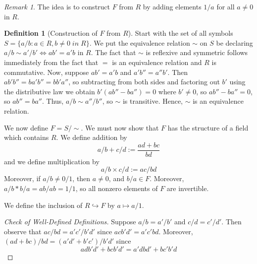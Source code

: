 \documentclass[12pt]{article}
\theoremstyle{definition}
\newtheorem{defn}[thm]{Definition}
\theoremstyle{remark}
\newtheorem{rmk}[thm]{Remark}
\numberwithin{equation}{section}
\begin{document}
\vspace{15pt}

\begin{rmk}
        The idea is to construct $F$ from $R$ by adding elements $1/a$ for all $a \neq 0$ in $R$.
\end{rmk}


\vspace{15pt}

\begin{defn}[Construction of $F$ from $R$]
        Start with the set of all symbols $S = \{a/b:a \in R, b \neq 0 \;in\;R\}$. We put the equivalence relation $\sim$ on $S$ be declaring $a/b\sim a'/b' \iff ab' = a'b$ in $R$. The fact that $\sim$ is reflexive and symmetric follows immediately from the fact that $=$ is an equivalence relation and $R$ is commutative. Now, suppose $ab' = a'b$ and $a'b'' = a''b'$. Then $ab'b'' =ba'b'' = bb'a''$, so subtracting from both sides and factoring out $b'$ using the distributive law we obtain $b'(ab''-ba'') = 0$ where $b' \neq 0$, so $ab'' - ba'' = 0$, so $ab'' = ba''$. Thus, $a/b \sim a''/b''$, so $\sim$ is transitive. Hence, $\sim$ is an equivalence relation. 


        We now define $F = S/\sim$. We must now show that $F$ has the structure of a field which contains $R$. We define addition by \begin{equation}
                a/b+c/d :=\frac{ad+bc}{bd}
        \end{equation}
        and we define multiplication by \begin{equation}
                a/b\times c/d := ac/bd
        \end{equation}
        Moreover, if $a/b \neq 0/1$, then $a \neq 0$, and $b/a \in F$. Moreover, $a/b*b/a = ab/ab = 1/1$, so all nonzero elements of $F$ are invertible.


        We define the inclusion of $R \hookrightarrow F$ by $a \mapsto a/1$.
\end{defn}
\begin{proof}
        [Check of Well-Defined Definitions] Suppose $a/b=a'/b'$ and $c/d = c'/d'$. Then observe that $ac/bd = a'c'/b'd'$ since $acb'd' = a'c'bd$. Moreover, $(ad+bc)/bd = (a'd'+b'c')/b'd'$ since \begin{equation*}
                adb'd' + bcb'd' = a'dbd' + bc'b'd
        \end{equation*}
\end{proof}


\vspace{15pt}
\end{document}
